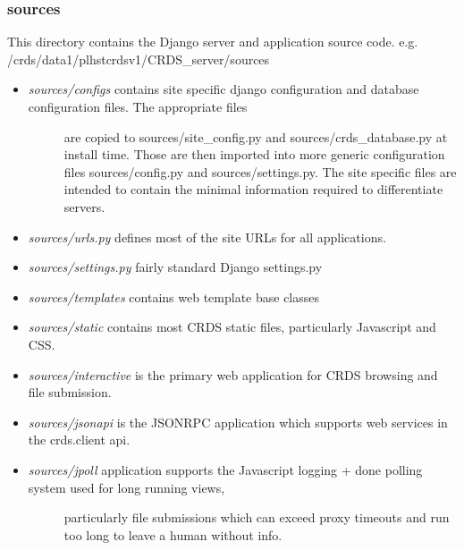 \documentclass[letterpaper,10pt,english]{sphinxmanual}
\begin{document}
\subsubsection{sources}
\label{server_guide:sources}
This directory contains the Django server and application source code.   e.g. /crds/data1/plhstcrdsv1/CRDS\_server/sources
\begin{itemize}
\item {} \begin{description}
\item[{\emph{sources/configs} contains site specific django configuration and database configuration files.  The appropriate files}] \leavevmode
are copied to sources/site\_config.py and sources/crds\_database.py at install time.   Those are then
imported into more generic configuration files sources/config.py and sources/settings.py.   The site
specific files are intended to contain the minimal information required to differentiate servers.

\end{description}

\item {} 
\emph{sources/urls.py}     defines most of the site URLs for all applications.

\item {} 
\emph{sources/settings.py} fairly standard Django settings.py

\item {} 
\emph{sources/templates}  contains web template base classes

\item {} 
\emph{sources/static}     contains most CRDS static files,  particularly Javascript and CSS.

\item {} 
\emph{sources/interactive}  is the primary web application for CRDS browsing and file submission.

\item {} 
\emph{sources/jsonapi}     is the JSONRPC application which supports web services in the crds.client api.

\item {} \begin{description}
\item[{\emph{sources/jpoll}    application supports the Javascript logging + done polling system used for long running views,}] \leavevmode
particularly file submissions which can exceed proxy timeouts and run too long to leave a human
without info.


\end{description}
\end{itemize}
\end{document}
